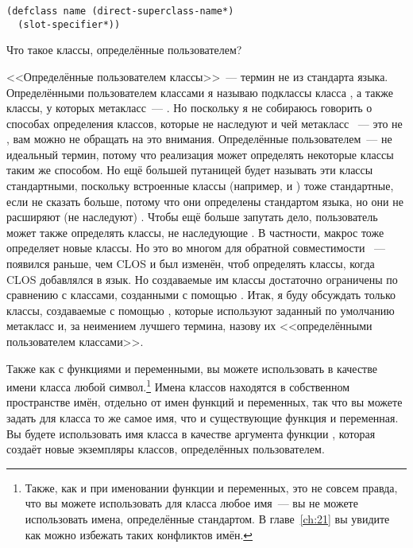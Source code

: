 \begin{lstlisting}
(defclass name (direct-superclass-name*)
  (slot-specifier*))
\end{lstlisting}

Что такое классы, определённые пользователем?

<<Определённые пользователем классы>>~--- термин не из стандарта языка. Определёнными
пользователем классами я называю подклассы класса , а также классы,
у которых метакласс~--- . Но поскольку я не собираюсь говорить о
способах определения классов, которые не наследуют  и чей метакласс
~--- это не , вам можно не обращать на это внимания. Определённые
пользователем~--- не идеальный термин, потому что реализация может определять некоторые
классы таким же способом. Но ещё большей путаницей будет называть эти классы стандартными,
поскольку встроенные классы (например,  и ) тоже стандартные,
если не сказать больше, потому что они определены стандартом языка, но они не расширяют
(не наследуют) . Чтобы ещё больше запутать дело, пользователь может
также определять классы, не наследующие . В частности, макрос
 тоже определяет новые классы. Но это во многом для обратной совместимости
~---  появился раньше, чем CLOS и был изменён, чтоб определять классы, когда
CLOS добавлялся в язык. Но создаваемые им классы достаточно ограничены по сравнению с
классами, созданными с помощью . Итак, я буду обсуждать только классы,
создаваемые с помощью , которые используют заданный по умолчанию метакласс
 и, за неимением лучшего термина, назову их <<определёнными
пользователем классами>>.

Также как с функциями и переменными, вы можете использовать в качестве имени класса любой
символ.\footnote{Также, как и при именовании функции и переменных, это не совсем правда,
  что вы можете использовать для класса любое имя~--- вы не можете использовать имена,
  определённые стандартом.  В главе~\ref{ch:21} вы увидите как можно избежать таких конфликтов
  имён.}  Имена классов находятся в собственном пространстве имён, отдельно от имен
функций и переменных, так что вы можете задать для класса то же самое имя, что и
существующие функция и переменная.  Вы будете использовать имя класса в качестве аргумента
функции , которая создаёт новые экземпляры классов, определённых
пользователем.

